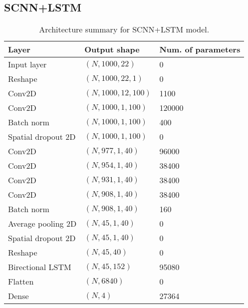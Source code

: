 \documentclass{article}
\begin{document}
\subsection{SCNN+LSTM}
\begin{table}[ht]
\begin{center}
    \begin{tabular}{|l|l|l|}
        \hline
        Layer   & Output shape  & Num. of parameters \\
        \hline\hline
        Input layer         & $(N, 1000, 22)$       & 0         \\
        Reshape             & $(N, 1000, 22, 1)$    & 0         \\
        Conv2D              & $(N, 1000, 12, 100)$  & 1100      \\
        Conv2D              & $(N, 1000, 1, 100)$   & 120000    \\
        Batch norm          & $(N, 1000, 1, 100)$   & 400       \\
        Spatial dropout 2D  & $(N, 1000, 1, 100)$   & 0         \\
        Conv2D              & $(N, 977, 1, 40)$     & 96000     \\
        Conv2D              & $(N, 954, 1,40)$      & 38400     \\
        Conv2D              & $(N, 931, 1, 40)$     & 38400     \\
        Conv2D              & $(N, 908, 1, 40)$     & 38400     \\
        Batch norm          & $(N, 908, 1, 40)$     & 160       \\
        Average pooling 2D  & $(N, 45, 1, 40)$      & 0         \\
        Spatial dropout 2D  & $(N, 45, 1, 40)$      & 0         \\
        Reshape             & $(N, 45, 40)$         & 0         \\
        Birectional LSTM    & $(N, 45, 152)$        & 95080     \\
        Flatten             & $(N, 6840)$           & 0         \\
        Dense               & $(N, 4)$              & 27364     \\
        \hline
    \end{tabular}
\end{center}
\caption{Architecture summary for SCNN+LSTM model.}
\label{tab:lstm}
\end{table}
\end{document}
